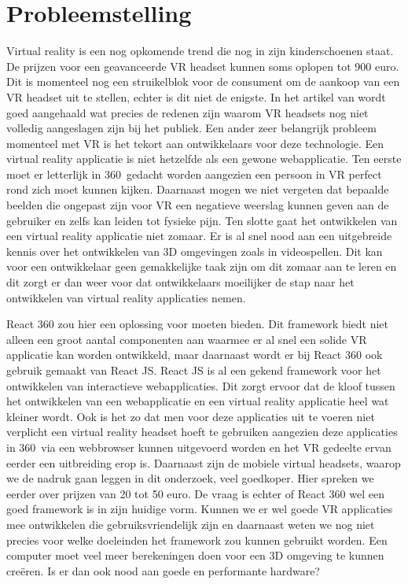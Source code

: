 \section{Probleemstelling}
\label{sec:probleemstelling}

Virtual reality is een nog opkomende trend die nog in zijn kinderschoenen staat. De prijzen voor een geavanceerde VR headset kunnen soms oplopen tot 900 euro. Dit is momenteel nog een struikelblok voor de consument om de aankoop van een VR  headset uit te stellen, echter is dit niet de enigste. In het artikel van \autocite{Abarrera2017} wordt goed aangehaald wat precies de redenen zijn waarom VR headsets nog niet volledig aangeslagen zijn bij het publiek. Een ander zeer belangrijk probleem momenteel met VR is het tekort aan ontwikkelaars voor deze technologie. Een virtual reality applicatie is niet hetzelfde als een gewone webapplicatie. Ten eerste moet er letterlijk in 360\textdegree\  gedacht worden aangezien een persoon in VR perfect rond zich moet kunnen kijken. Daarnaast mogen we niet vergeten dat bepaalde beelden die ongepast zijn voor VR een negatieve weerslag kunnen geven aan de gebruiker en zelfs kan leiden tot fysieke pijn. Ten slotte gaat het ontwikkelen van een virtual reality applicatie niet zomaar. Er is al snel nood aan een uitgebreide kennis over het ontwikkelen van 3D omgevingen zoals in videospellen. Dit kan voor een ontwikkelaar geen gemakkelijke taak zijn om dit zomaar aan te leren en dit zorgt er dan weer voor dat ontwikkelaars moeilijker de stap naar het ontwikkelen van virtual reality applicaties nemen.

React 360 zou hier een oplossing voor moeten bieden. Dit framework biedt niet alleen een groot aantal componenten aan waarmee er al snel een solide VR applicatie kan worden ontwikkeld, maar daarnaast wordt er bij React 360 ook gebruik gemaakt van React JS. React JS is al een gekend framework voor het ontwikkelen van interactieve webapplicaties. Dit zorgt ervoor dat de kloof tussen het ontwikkelen van een webapplicatie en een virtual reality applicatie heel wat kleiner wordt. Ook is het zo dat men voor deze applicaties uit te voeren niet verplicht een virtual reality headset hoeft te gebruiken aangezien deze applicaties in 360\textdegree\ via een webbrowser kunnen uitgevoerd worden en het VR gedeelte ervan eerder een uitbreiding erop is. Daarnaast zijn de mobiele virtual headsets, waarop we de nadruk gaan leggen in dit onderzoek, veel goedkoper. Hier spreken we eerder over prijzen van 20 tot 50 euro. De vraag is echter of React 360 wel een goed framework is in zijn huidige vorm. Kunnen we er wel goede VR applicaties mee ontwikkelen die gebruiksvriendelijk zijn en daarnaast weten we nog niet precies voor welke doeleinden het framework zou kunnen gebruikt worden. Een computer moet veel meer berekeningen doen voor een 3D omgeving te kunnen creëren. Is er dan ook nood aan goede en performante hardware? 



